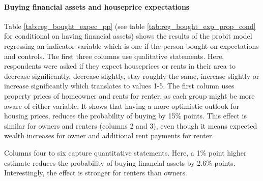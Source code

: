 \documentclass[ProjectABM]{subfiles}
\begin{document}
%



\paragraph{Buying financial assets and houseprice expectations}
Table \ref{tab:reg_bought_expec_pp} (see table \ref{tab:reg_bought_exp_prop_cond} for conditional on having financial assets) shows the results of the probit model regressing an indicator variable which is one if the person bought on expectations and controls. The first three columns use qualitative statements. Here, respondents were asked if they expect houseprices or rents in their area to decrease significantly, decrease slightly, stay roughly the same, increase slightly or increase significantly which translates to values 1-5. The first column uses property prices of homeowner and rents for renter, as each group might be more aware of either variable. It shows that having a more optimistic outlook for housing prices, reduces the probability of buying by 15\% points. This effect is similar for owners and renters (columns 2 and 3), even though it means expected wealth increases for owner and additional rent payments for renter.%

Columns four to six capture quantitative statements. Here, a 1\% point higher estimate reduces the probability of buying financial assets by 2.6\% points. Interestingly, the effect is stronger for renters than owners.
\end{document}
